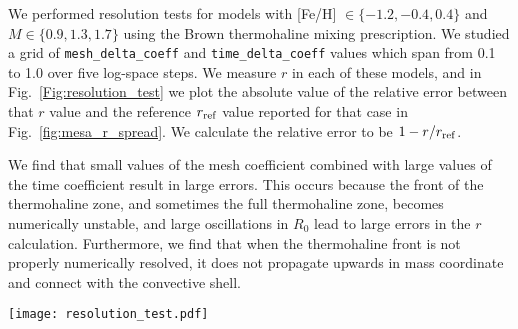 We performed resolution tests for models with [Fe/H] $\in \{-1.2, -0.4, 0.4\}$ and $M \in \{0.9, 1.3, 1.7\}$ using the Brown thermohaline mixing prescription.
We studied a grid of \texttt{mesh\_delta\_coeff} and \texttt{time\_delta\_coeff} values which span from 0.1 to 1.0 over five log-space steps.
We measure $r$ in each of these models, and in Fig.~\ref{Fig:resolution_test} we plot the absolute value of the relative error between that $r$ value and the reference $r_{\rm ref}$ value reported for that case in Fig.~\ref{fig:mesa_r_spread}.
We calculate the relative error to be $1 - r/r_{\rm{ref}}$.

We find that small values of the mesh coefficient combined with large values of the time coefficient result in large errors.
This occurs because the front of the thermohaline zone, and sometimes the full thermohaline zone, becomes numerically unstable, and large oscillations in $R_0$ lead to large errors in the $r$ calculation.
Furthermore, we find that when the thermohaline front is not properly numerically resolved, it does not propagate upwards in mass coordinate and connect with the convective shell.


\begin{figure*}[!tb]
\begin{center}
\texttt{[image: resolution\_test.pdf]}
\caption{This is a template figure showing relative error in a calculation as a function of mesh and time delta coefficient. It'll look nicer. It also won't have the same data repeated 9 times once the data finish running!}
\label{Fig:resolution_test}
\end{center}
\end{figure*}